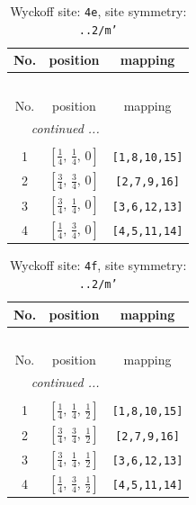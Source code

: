 \documentclass[fleqn,8pt]{jsarticle}
\begin{document}
\begin{longtable}{ccc}
\caption{Wyckoff site: {\tt 4e}, site symmetry: {\tt ..2/m'}}
 \\
 \hline \hline
No. & position & mapping \\ \hline \endfirsthead

\multicolumn{2}{l}{\tablename\ \thetable{}} \\
 \hline \hline
No. & position & mapping \\ \hline \endhead

 \hline \hline
\multicolumn{2}{r}{\footnotesize\it continued ...} \\ \endfoot

 \hline \hline
\multicolumn{2}{r}{} \\ \endlastfoot

1 & $\left[ \frac{1}{4},\, \frac{1}{4},\, 0 \right]$ & {\tt [1,8,10,15]} \\ \hline
2 & $\left[ \frac{3}{4},\, \frac{3}{4},\, 0 \right]$ & {\tt [2,7,9,16]} \\ \hline
3 & $\left[ \frac{3}{4},\, \frac{1}{4},\, 0 \right]$ & {\tt [3,6,12,13]} \\ \hline
4 & $\left[ \frac{1}{4},\, \frac{3}{4},\, 0 \right]$ & {\tt [4,5,11,14]} \\
\end{longtable}
\renewcommand{\arraystretch}{1.2}
\begin{longtable}{ccc}
\caption{Wyckoff site: {\tt 4f}, site symmetry: {\tt ..2/m'}}
 \\
 \hline \hline
No. & position & mapping \\ \hline \endfirsthead

\multicolumn{2}{l}{\tablename\ \thetable{}} \\
 \hline \hline
No. & position & mapping \\ \hline \endhead

 \hline \hline
\multicolumn{2}{r}{\footnotesize\it continued ...} \\ \endfoot

 \hline \hline
\multicolumn{2}{r}{} \\ \endlastfoot

1 & $\left[ \frac{1}{4},\, \frac{1}{4},\, \frac{1}{2} \right]$ & {\tt [1,8,10,15]} \\ \hline
2 & $\left[ \frac{3}{4},\, \frac{3}{4},\, \frac{1}{2} \right]$ & {\tt [2,7,9,16]} \\ \hline
3 & $\left[ \frac{3}{4},\, \frac{1}{4},\, \frac{1}{2} \right]$ & {\tt [3,6,12,13]} \\ \hline
4 & $\left[ \frac{1}{4},\, \frac{3}{4},\, \frac{1}{2} \right]$ & {\tt [4,5,11,14]} \\
\end{longtable}
\end{document}
